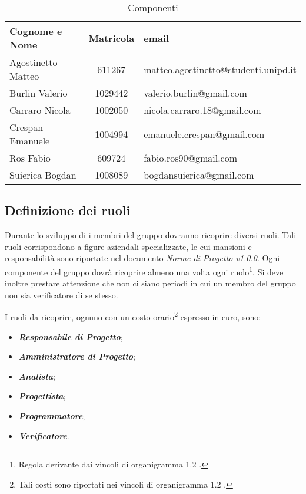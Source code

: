 \begin{table}[h]
	\centering
	\begin{tabular}{|l|c|l|}
		\toprule
		\textbf{Cognome e Nome} & \textbf{Matricola} & \textbf{email} \\
	
		\midrule
		Agostinetto Matteo & 611267 & matteo.agostinetto@studenti.unipd.it \\
		Burlin Valerio & 1029442 & valerio.burlin@gmail.com \\ 
		Carraro Nicola & 1002050 & nicola.carraro.18@gmail.com \\
		Crespan Emanuele & 1004994 & emanuele.crespan@gmail.com \\
		Ros Fabio & 609724 & fabio.ros90@gmail.com \\
		Suierica Bogdan & 1008089 & bogdansuierica@gmail.com \\
		
		\bottomrule
	\end{tabular}
	\caption{Componenti}
\end{table}

\subsection{Definizione dei ruoli}
Durante lo sviluppo di \PROGETTO{} i membri del gruppo dovranno ricoprire diversi ruoli. Tali ruoli corrispondono a figure aziendali specializzate, le cui mansioni e responsabilità sono riportate nel documento \textit{Norme di Progetto v1.0.0}. Ogni componente del gruppo dovrà ricoprire almeno una volta ogni ruolo\footnote{Regola derivante dai vincoli di organigramma 1.2 .}. Si deve inoltre prestare attenzione che non ci siano periodi in cui un membro del gruppo non sia verificatore di se stesso.

\noindent I ruoli da ricoprire, ognuno con un costo orario\footnote{Tali costi sono riportati nei vincoli di organigramma 1.2 .} espresso in euro, sono: 
\begin{itemize}
	\item \textbf{\textit{Responsabile di Progetto}};
	\item \textbf{\textit{Amministratore di Progetto}};
	\item \textbf{\textit{Analista}};
	\item \textbf{\textit{Progettista}};
	\item \textbf{\textit{Programmatore}};
	\item \textbf{\textit{Verificatore}}.	
\end{itemize}


